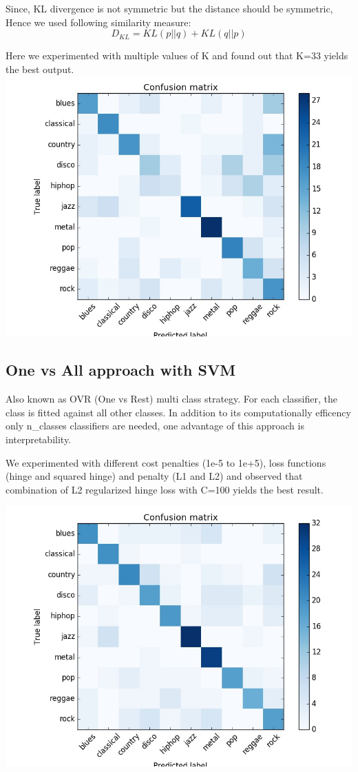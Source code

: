 \documentclass[conference]{IEEEtran}
\begin{document}
Since, KL divergence is not symmetric but the distance should be symmetric, Hence we used following similarity measure:
$$ {D}_{KL} =  KL\left(p||q\right) + KL\left(q||p\right) $$

Here we experimented with multiple values of K and found out that K=33 yields the best output.
\includegraphics[width=\columnwidth]{KNN}

\subsection{One vs All approach with SVM}
\label{sub:One vs All approach with SVM}

Also known as OVR (One vs Rest) multi class strategy. For each classifier, the class is fitted against all other classes. In addition to its computationally efficency only n{\_}classes classifiers are needed, one advantage of this approach is interpretability.

 We experimented with different cost penalties (1e-5 to 1e+5), loss functions (hinge and squared hinge) and penalty (L1 and L2) and observed that combination of L2 regularized hinge loss with C=100 yields the best result.

\includegraphics[width=\columnwidth]{LINEARSVC}
\end{document}
